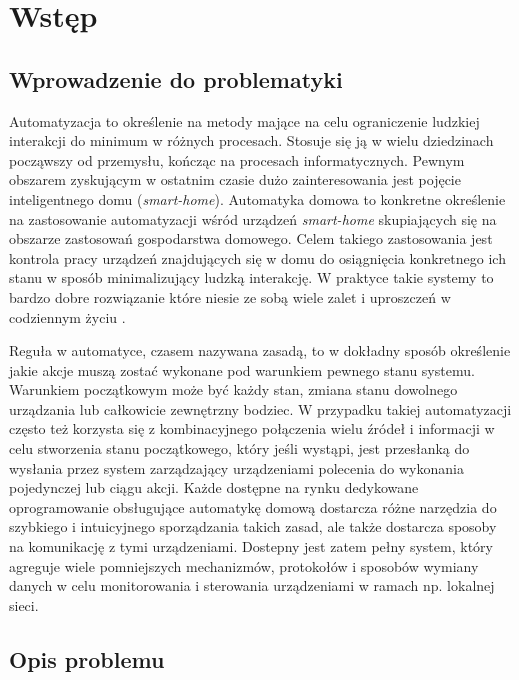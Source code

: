
\chapter{Wstęp}

\section{Wprowadzenie do problematyki}

Automatyzacja to określenie na metody mające na celu ograniczenie ludzkiej interakcji do minimum w różnych procesach. Stosuje się ją w wielu dziedzinach począwszy od przemysłu, kończąc na procesach informatycznych. Pewnym obszarem zyskującym w ostatnim czasie dużo zainteresowania jest pojęcie inteligentnego domu (\textit{smart-home}). Automatyka domowa to konkretne określenie na zastosowanie automatyzacji wśród urządzeń \textit{smart-home} skupiających się na obszarze zastosowań gospodarstwa domowego. Celem takiego zastosowania jest kontrola pracy urządzeń znajdujących się w domu do osiągnięcia konkretnego ich stanu w sposób minimalizujący ludzką interakcję. W praktyce takie systemy to bardzo dobre rozwiązanie które niesie ze sobą wiele zalet i uproszczeń w codziennym życiu \cite{szablowski2019projektowanie}.

Reguła w automatyce, czasem nazywana zasadą, to w dokładny sposób określenie jakie akcje muszą zostać wykonane pod warunkiem pewnego stanu systemu. Warunkiem początkowym może być każdy stan, zmiana stanu dowolnego urządzania lub całkowicie zewnętrzny bodziec. W przypadku takiej automatyzacji często też korzysta się z kombinacyjnego połączenia wielu źródeł i informacji w celu stworzenia stanu początkowego, który jeśli wystąpi, jest przesłanką do wysłania przez system zarządzający urządzeniami polecenia do wykonania pojedynczej lub ciągu akcji. Każde dostępne na rynku dedykowane oprogramowanie obsługujące automatykę domową dostarcza różne narzędzia do szybkiego i intuicyjnego sporządzania takich zasad, ale także dostarcza sposoby na komunikację z tymi urządzeniami. Dostepny jest zatem pełny system, który agreguje wiele pomniejszych mechanizmów, protokołów i sposobów wymiany danych w celu monitorowania i sterowania urządzeniami w ramach np. lokalnej sieci.

\section{Opis problemu}

